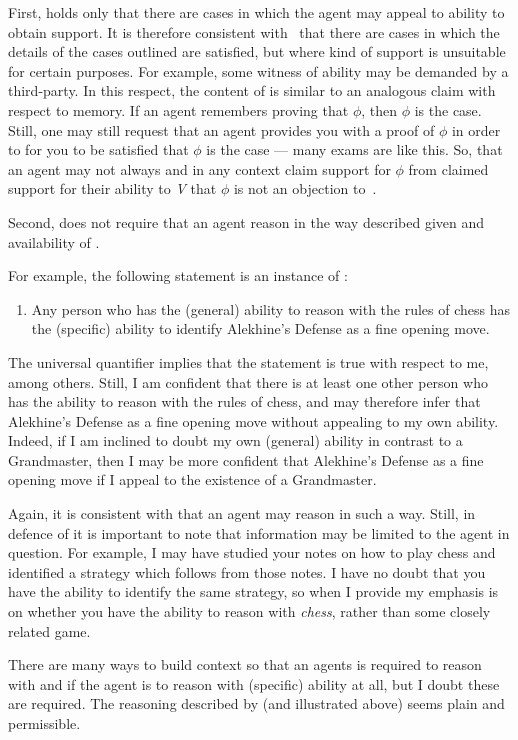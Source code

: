 \begin{note}
  First, \eA{} holds only that there are cases in which the agent may appeal to ability to obtain support.
  It is therefore consistent with~\eA{} that there are cases in which the details of the cases outlined are satisfied, but where kind of support is unsuitable for certain purposes.
  For example, some witness of ability may be demanded by a third-party.
  In this respect, the content of \eA{} is similar to an analogous claim with respect to memory.
  If an agent remembers proving that \(\phi\), then \(\phi\) is the case.
  Still, one may still request that an agent provides you with a proof of \(\phi\) in order to for you to be satisfied that \(\phi\) is the case --- many exams are like this.
  So, that an agent may not always and in any context claim support for \(\phi\) from claimed support for their ability to \emph{V} that \(\phi\) is not an objection to~\eA{}.
\end{note}

\begin{note}
  Second, \eA{} does not require that an agent reason in the way described given \gsi{} and availability of .

  For example, the following statement is an instance of \gsi{}:
  \begin{enumerate}
  \item Any person who has the (general) ability to reason with the rules of chess has the (specific) ability to identify Alekhine's Defense as a fine opening move.
  \end{enumerate}
  The universal quantifier implies that the statement is true with respect to me, among others.
  Still, I am confident that there is at least one other person who has the ability to reason with the rules of chess, and may therefore infer that Alekhine's Defense as a fine opening move without appealing to my own ability.
  Indeed, if I am inclined to doubt my own (general) ability in contrast to a Grandmaster, then I may be more confident that Alekhine's Defense as a fine opening move if I appeal to the existence of a Grandmaster.

  Again, it is consistent with \eA{} that an agent may reason in such a way.
  Still, in defence of \eA{} it is important to note that \gsi{} information may be limited to the agent in question.
  For example, I may have studied your notes on how to play chess and identified a strategy which follows from those notes.
  I have no doubt that you have the ability to identify the same strategy, so when I provide \gsi{} my emphasis is on whether you have the ability to reason with \emph{chess}, rather than some closely related game.

  There are many ways to build context so that an agents is required to reason with \gsi{} and  if the agent is to reason with (specific) ability at all, but I doubt these are required.
  The reasoning described by \eA{} (and illustrated above) seems plain and permissible.
\end{note}

